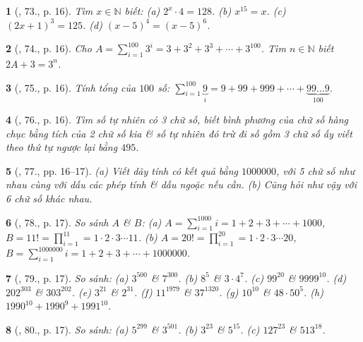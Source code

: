 \documentclass{article}
\newtheorem{baitoan}{}
\begin{document}
\begin{baitoan}[\cite{Binh_Toan_6_tap_1}, 73., p. 16]
	Tìm $x\in\mathbb{N}$ biết: (a) $2^x\cdot4 = 128$. (b) $x^{15} = x$. (c) $(2x + 1)^3 = 125$. (d) $(x - 5)^4 = (x - 5)^6$.
\end{baitoan}

\begin{baitoan}[\cite{Binh_Toan_6_tap_1}, 74., p. 16]
	Cho $A = \sum_{i=1}^{100} 3^i = 3 + 3^2 + 3^3 + \cdots + 3^{100}$. Tìm $n\in\mathbb{N}$ biết $2A + 3 = 3^n$.
\end{baitoan}

\begin{baitoan}[\cite{Binh_Toan_6_tap_1}, 75., p. 16]
	Tính tổng của $100$ số: $\sum_{i=1}^{100} \underbrace{9}_i = 9+ 99 + 999 + \cdots + \underbrace{99\ldots9}_{100}$.
\end{baitoan}

\begin{baitoan}[\cite{Binh_Toan_6_tap_1}, 76., p. 16]
	Tìm số tự nhiên có 3 chữ số, biết bình phương của chữ số hàng chục bằng tích của 2 chữ số kia \& số tự nhiên đó trừ đi số gồm 3 chữ số ấy viết theo thứ tự ngược lại bằng $495$.
\end{baitoan}

\begin{baitoan}[\cite{Binh_Toan_6_tap_1}, 77., pp. 16--17]
	(a) Viết dãy tính có kết quả bằng $1000000$, với 5 chữ số như nhau cùng với dấu các phép tính \& dấu ngoặc nếu cần. (b) Cũng hỏi như vậy với 6 chữ số khác nhau.
\end{baitoan}

\begin{baitoan}[\cite{Binh_Toan_6_tap_1}, 78., p. 17]
	So sánh $A$ \& $B$: (a) $A = \sum_{i=1}^{1000} i = 1 + 2 + 3 + \cdots + 1000$, $B = 11! = \prod_{i=1}^{11} = 1\cdot2\cdot3\cdots11$. (b) $A = 20! = \prod_{i=1}^{20} = 1\cdot2\cdot3\cdots20$, $B = \sum_{i=1}^{1000000} i = 1 + 2 + 3 + \cdots + 1000000$.
\end{baitoan}

\begin{baitoan}[\cite{Binh_Toan_6_tap_1}, 79., p. 17]
	So sánh: (a) $3^{500}$ \& $7^{300}$. (b) $8^5$ \& $3\cdot4^7$. (c) $99^{20}$ \& $9999^{10}$. (d) $202^{303}$ \& $303^{202}$. (e) $3^{21}$ \& $2^{31}$. (f) $11^{1979}$ \& $37^{1320}$. (g) $10^10$ \& $48\cdot50^5$. (h) $1990^{10} + 1990^9 + 1991^{10}$.
\end{baitoan}

\begin{baitoan}[\cite{Binh_Toan_6_tap_1}, 80., p. 17]
	So sánh: (a) $5^{299}$ \& $3^{501}$. (b) $3^{23}$ \& $5^{15}$. (c) $127^{23}$ \& $513^{18}$.
\end{baitoan}
\end{document}
